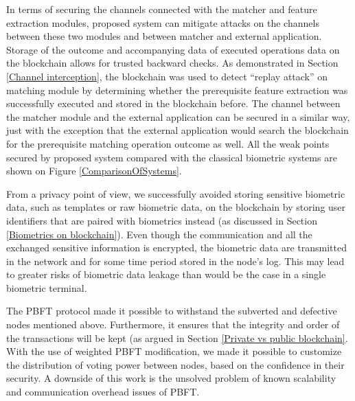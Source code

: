In terms of securing the channels connected with the matcher and feature extraction modules, proposed system can mitigate attacks on the channels between these two modules and between matcher and external application. Storage of the outcome and accompanying data of executed operations data on the blockchain allows for trusted backward checks. As demonstrated in Section \ref{Channel interception}, the blockchain was used to detect ``replay attack'' on matching module by determining whether the prerequisite feature extraction was successfully executed and stored in the blockchain before. The channel between the matcher module and the external application can be secured in a similar way, just with the exception that the external application would search the blockchain for the prerequisite matching operation outcome as well. All the weak points secured by proposed system compared with the classical biometric systems are shown on Figure \ref{ComparisonOfSystems}.

From a privacy point of view, we successfully avoided storing sensitive biometric data, such as templates or raw biometric data, on the blockchain by storing user identifiers that are paired with biometrics instead (as discussed in Section \ref{Biometrics on blockchain}). Even though the communication and all the exchanged sensitive information is encrypted, the biometric data are transmitted in the network and for some time period stored in the node's log. This may lead to greater risks of biometric data leakage than would be the case in a single biometric terminal.

The PBFT protocol made it possible to withstand the subverted and defective nodes mentioned above. Furthermore, it ensures that the integrity and order of the transactions will be kept (as argued in Section \ref{Private vs public blockchain}. With the use of weighted PBFT modification, we made it possible to customize the distribution of voting power between nodes, based on the confidence in their security. A downside of this work is the unsolved problem of known scalability and communication overhead issues of PBFT.

